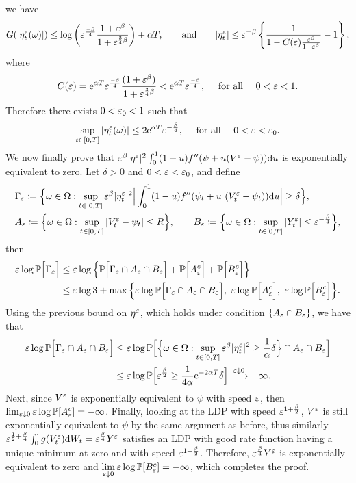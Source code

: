 we have
$$
G(|\eta_{t}^\varepsilon(\omega)|) 
\leq \log\left(\varepsilon^{\frac{-\beta}{4}}\frac{1+\varepsilon^\beta}{1 + \varepsilon^{\frac{3}{4}\beta}}\right) + \alpha T,
\qquad\text{and}\qquad
|\eta_{t}^\varepsilon| \leq \varepsilon^{-\beta}\left\{\frac{1}{1 - C(\varepsilon)\frac{\varepsilon^\beta}{1 + \varepsilon^\beta}} - 1 \right\},
$$
where 
$$
C(\varepsilon) = \mathrm{e}^{\alpha T}\varepsilon^{\frac{-\beta}{4}}\frac{(1+\varepsilon^\beta)}{1 + \varepsilon^{\frac{3}{4}\beta}}
 <\mathrm{e}^{\alpha T}\varepsilon^{\frac{-\beta}{4}}, 
\quad \text{ for all } \quad 0<\varepsilon<1.
$$
Therefore there exists $0<\varepsilon_0<1$ such that
\[
\sup_{t \in [0,T]}|\eta_{t}^\varepsilon(\omega)|\leq 2\mathrm{e}^{\alpha T}\varepsilon^{-\frac{\beta}{4}},
\quad \text{ for all } \quad 0 < \varepsilon <\varepsilon_0.
\]
We now finally prove that $\varepsilon^\beta |\eta^\varepsilon|^2 \int_0^1 (1-u)f''(\psi + u (V^\varepsilon - \psi))\mathrm{d} u$ is exponentially equivalent to zero.
Let $\delta >0$ and $0<\varepsilon<\varepsilon_0$, and define
\begin{align*}
&\Gamma_\eps \defEqual \Big\{\omega\in\Omega : \sup_{t \in [0,T]}\eps^\beta |\eta_{t}^\eps|^2 \Big|\int_0^1 (1-u)f''(\psi_t + u\ (V^{\eps}_{t} - \psi_t))\D u\Big|\geq \delta\Big\}, \\
&A_\eps \defEqual \Big\{\omega\in\Omega : \sup_{t \in [0,T]}|V^\eps_t - \psi_t|\leq  R \Big\},
\qquad
B_\eps \defEqual \Big\{\omega\in\Omega : \sup_{t\in[0,T]}|Y_t^\eps|\leq \eps^{-\frac{\beta}{4}}\Big\},
\end{align*}
then
\begin{align*}
\varepsilon\log\mathbb{P}\Big[\Gamma_\varepsilon\Big]
&\leq \varepsilon\log \Big\{ \mathbb{P}\Big[\Gamma_\varepsilon \cap A_\varepsilon \cap B_\varepsilon\Big] + \mathbb{P}\Big[A_\varepsilon^c \Big] + \mathbb{P}\Big[B_\varepsilon^c   \Big]\Big\} \\
&\leq \varepsilon\log3 + \max \Big \{ \varepsilon\log \mathbb{P}\Big[\Gamma_\varepsilon \cap A_\varepsilon \cap B_\varepsilon\Big], \  \varepsilon\log \mathbb{P}\Big[A_\varepsilon^c \Big], \  \varepsilon\log \mathbb{P}\Big[B_\varepsilon^c \Big] \Big\}.
\end{align*}
Using the previous bound on $\eta^\varepsilon$, which holds under condition $\{A_\varepsilon\cap B_\varepsilon\}$, we have that
\begin{align*}
\varepsilon\log \mathbb{P}\Big[\Gamma_\varepsilon \cap A_\varepsilon \cap B_\varepsilon\Big]
&\leq \varepsilon\log \mathbb{P}\Big[\Big\{\omega\in\Omega : \sup_{t \in [0,T]}\varepsilon^\beta |\eta_{t}^\varepsilon|^2\geq \frac{1}{\alpha}\delta\Big\} \cap A_\varepsilon \cap B_\varepsilon\Big] \\
&\leq \varepsilon\log \mathbb{P}\Big[\varepsilon^{\frac{\beta}{2}}\geq \frac{1}{4\alpha}\mathrm{e}^{-2\alpha T}\delta \Big]
\xrightarrow{\varepsilon \downarrow 0}-\infty.
\end{align*}
Next, since $V^\varepsilon$ is exponentially equivalent to $\psi$ with speed $\varepsilon$, then $\lim_{\varepsilon\downarrow 0}\varepsilon\log \mathbb{P}[A_\varepsilon^c] = -\infty$. Finally, looking at the LDP with speed $\varepsilon^{1 + \frac{\beta}{2}}$, $V^\varepsilon$ is still  exponentially equivalent to $\psi$ by the same argument as before, thus similarly $\varepsilon^{\frac{1}{2} + \frac{\beta}{4}}\int_0^\cdot g(V^\varepsilon_t)\mathrm{d} W_t = \varepsilon^{\frac{\beta}{4}}Y^\varepsilon$ satisfies an LDP with good rate function having a unique minimum at zero and with speed $\varepsilon^{1 + \frac{\beta}{2}}$. Therefore, $\varepsilon^{\frac{\beta}{4}}Y^\varepsilon$ is exponentially equivalent to zero and
$\lim\limits_{\varepsilon\downarrow 0}\varepsilon \log \mathbb{P}[B_\varepsilon^c] = -\infty$, which completes the proof.

